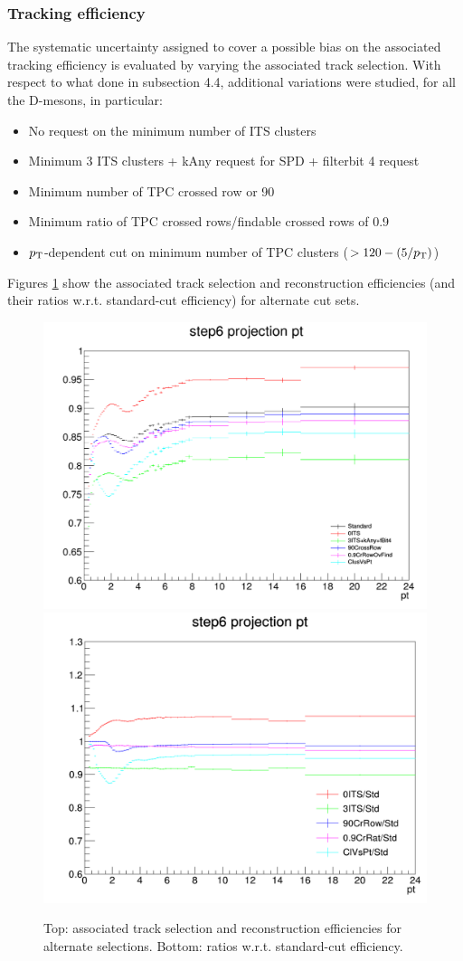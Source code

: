 \subsubsection{Tracking efficiency}
The systematic uncertainty assigned to cover a possible bias on the associated tracking efficiency is evaluated by varying the associated track selection.
With respect to what done in subsection 4.4, additional variations were studied, for all the D-mesons, in particular:
\begin{itemize}
  \item No request on the minimum number of ITS clusters
  \item Minimum 3 ITS clusters + kAny request for SPD + filterbit 4 request
  \item Minimum number of TPC crossed row or 90
  \item Minimum ratio of TPC crossed rows/findable crossed rows of 0.9
  \item $p_{\rm T}$-dependent cut on minimum number of TPC clusters ($> 120-(5/p_{\rm T})$)
\end{itemize}

Figures \ref{fig:TrEffVariations} show the associated track selection and reconstruction efficiencies (and their ratios w.r.t. standard-cut efficiency) for alternate cut sets.

\begin{figure}
\centering
{\includegraphics[width=0.75\linewidth]{figuresVsCent/Dzero/SystTrackEff/AltTrackEff.png}}
{\includegraphics[width=0.75\linewidth]{figuresVsCent/Dzero/SystTrackEff/AltTrackEffRatios.png}}
\caption{Top: associated track selection and reconstruction efficiencies for alternate selections. Bottom: ratios w.r.t. standard-cut efficiency.}
\label{fig:TrEffVariations}
\end{figure}

